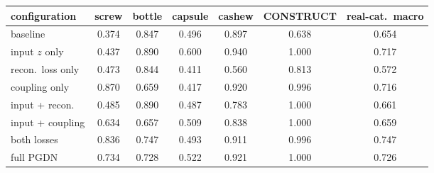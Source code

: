 \setlength{\tabcolsep}{3pt}
\begin{tabular}{@{}lcccccc@{}}
\toprule
configuration & screw & bottle & capsule & cashew & CONSTRUCT & real-cat.\ macro \\
\midrule
baseline & 0.374 & 0.847 & 0.496 & 0.897 & 0.638 & 0.654 \\
input $z$ only & 0.437 & 0.890 & 0.600 & 0.940 & 1.000 & 0.717 \\
recon.~loss only & 0.473 & 0.844 & 0.411 & 0.560 & 0.813 & 0.572 \\
coupling only & 0.870 & 0.659 & 0.417 & 0.920 & 0.996 & 0.716 \\
input + recon. & 0.485 & 0.890 & 0.487 & 0.783 & 1.000 & 0.661 \\
input + coupling & 0.634 & 0.657 & 0.509 & 0.838 & 1.000 & 0.659 \\
both losses & 0.836 & 0.747 & 0.493 & 0.911 & 0.996 & 0.747 \\
full PGDN & 0.734 & 0.728 & 0.522 & 0.921 & 1.000 & 0.726 \\
\bottomrule
\end{tabular}
